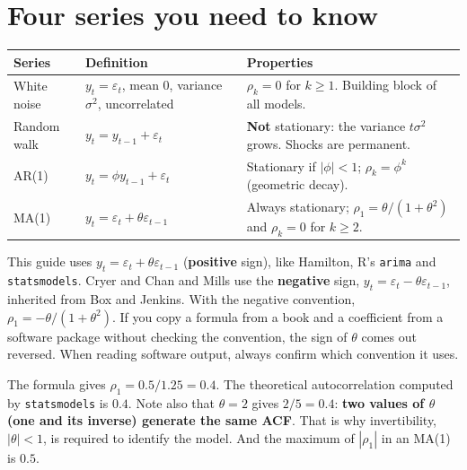 \section{Four series you need to know}
\begin{center}
\small
\begin{tabular}{p{3.2cm}p{4.1cm}p{6.4cm}}
\toprule
\textbf{Series} & \textbf{Definition} & \textbf{Properties} \\
\midrule
White noise & $y_t=\varepsilon_t$, mean 0, variance $\sigma^2$, uncorrelated & $\rho_k=0$ for $k\ge1$. Building block of all models. \\
Random walk & $y_t=y_{t-1}+\varepsilon_t$ & \textbf{Not} stationary: the variance $t\sigma^2$ grows. Shocks are permanent. \\
AR(1) & $y_t=\phi y_{t-1}+\varepsilon_t$ & Stationary if $|\phi|<1$; $\rho_k=\phi^k$ (geometric decay). \\
MA(1) & $y_t=\varepsilon_t+\theta\varepsilon_{t-1}$ & Always stationary; $\rho_1=\theta/(1+\theta^2)$ and $\rho_k=0$ for $k\ge2$. \\
\bottomrule
\end{tabular}
\end{center}

\begin{atencao}
This guide uses $y_t=\varepsilon_t+\theta\varepsilon_{t-1}$ (\textbf{positive} sign), like Hamilton, R's \texttt{arima} and \texttt{statsmodels}. Cryer and Chan and Mills use the \textbf{negative} sign, $y_t=\varepsilon_t-\theta\varepsilon_{t-1}$, inherited from Box and Jenkins. With the negative convention, $\rho_1=-\theta/(1+\theta^2)$. If you copy a formula from a book and a coefficient from a software package without checking the convention, the sign of $\theta$ comes out reversed. When reading software output, always confirm which convention it uses.
\end{atencao}

\begin{simulacao}
The formula gives $\rho_1=0.5/1.25=0.4$. The theoretical autocorrelation computed by \texttt{statsmodels} is $0.4$. Note also that $\theta=2$ gives $2/5=0.4$: \textbf{two values of $\theta$ (one and its inverse) generate the same ACF}. That is why invertibility, $|\theta|<1$, is required to identify the model. And the maximum of $|\rho_1|$ in an MA(1) is $0.5$.
\end{simulacao}

